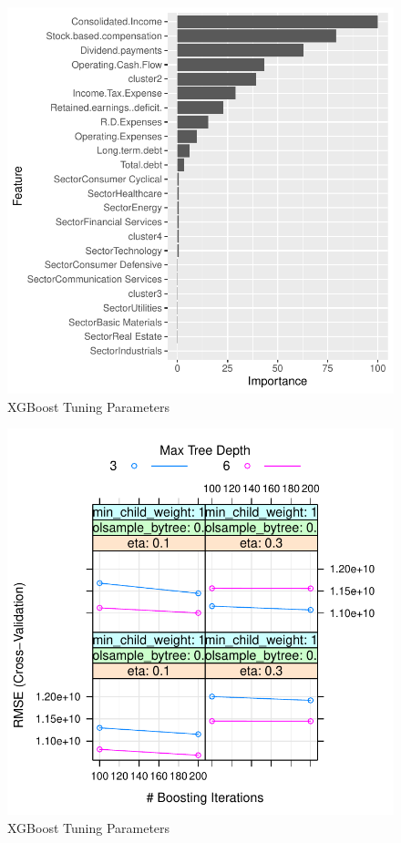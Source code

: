 \documentclass[11pt,]{article}
\begin{document}
\begin{figure}

{\centering \includegraphics{stock_analysis_files/figure-latex/XGBoost-1} 

}

\caption{XGBoost Tuning Parameters}\label{fig:XGBoost-1}
\end{figure}
\begin{figure}

{\centering \includegraphics{stock_analysis_files/figure-latex/XGBoost-2} 

}

\caption{XGBoost Tuning Parameters}\label{fig:XGBoost-2}
\end{figure}
\end{document}
